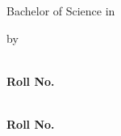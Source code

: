%
\thispagestyle{empty}
\begin{center}

\vspace*{4pt}

{\fontsize{20}{24}\selectfont \MakeUppercase{\thesistitle}}

\vfill

{\fontsize{12}{15}\selectfont \submissionstatement}

\vspace{6pt}

{\fontsize{12}{15}\selectfont Bachelor of Science in}

\vspace{4pt}

{\fontsize{12}{15}\selectfont \degreefield}

\vfill

{\fontsize{12}{15}\selectfont by}

\vspace{6pt}

{\fontsize{12}{15}\selectfont \textbf{\studentname}}\\[2pt]
{\fontsize{12}{15}\selectfont \textbf{Roll No. \studentroll}}

\vspace{6pt}

{\fontsize{12}{15}\selectfont \textbf{\studentnametwo}}\\[2pt]
{\fontsize{12}{15}\selectfont \textbf{Roll No. \studentrolltwo}}

\vfill


\end{center}
